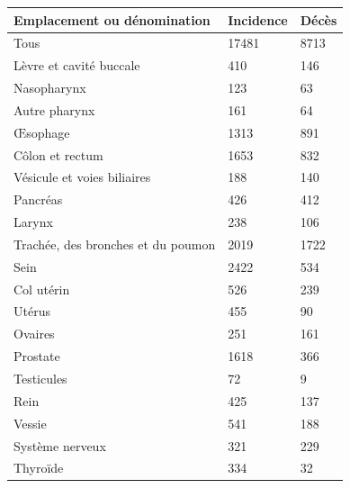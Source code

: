 \begin{table}[H]
    \centering
    \begin{tabular}{lll}
    \toprule
    \textbf{Emplacement ou dénomination}& \textbf{Incidence}& \textbf{Décès}\\ \midrule
    Tous                                & 17481             & 8713          \\  
    Lèvre et cavité buccale             & 410               & 146           \\  
    Nasopharynx                         & 123               & 63            \\  
    Autre pharynx                       & 161               & 64            \\  
    Œsophage                            & 1313              & 891           \\  
    Côlon et rectum                     & 1653              & 832           \\
    Vésicule et voies biliaires         & 188               & 140           \\
    Pancréas                            & 426               & 412           \\
    Larynx                              & 238               & 106           \\
    Trachée, des bronches et du poumon  & 2019              & 1722          \\
    Sein                                & 2422              & 534           \\
    Col utérin                          & 526               & 239           \\
    Utérus                              & 455               & 90            \\
    Ovaires                             & 251               & 161           \\
    Prostate                            & 1618              & 366           \\
    Testicules                          & 72                & 9             \\
    Rein                                & 425               & 137           \\
    Vessie                              & 541               & 188           \\
    Système nerveux                     & 321               & 229           \\
    Thyroïde                            & 334               & 32            \\

\end{tabular}
\end{table}
